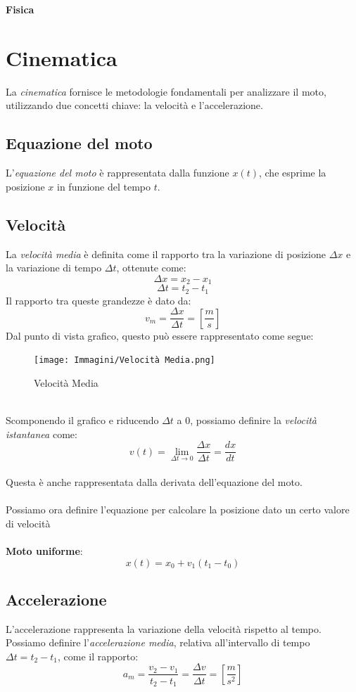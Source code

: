 \documentclass{article}
\begin{document}
\begin{title}
    \centering
    \huge\bfseries  %
    \noindent
    Fisica
\end{title}
\vspace{60pt}
\tableofcontents

\newpage

\section{Cinematica}
La \textit{cinematica} fornisce le metodologie fondamentali per analizzare il moto, utilizzando due concetti chiave: la velocità e l'accelerazione.
\subsection{Equazione del moto}
L'\textit{equazione del moto} è rappresentata dalla funzione \(x(t)\), che esprime la posizione \(x\) in funzione del tempo \(t\).
\subsection{Velocità}
La \textit{velocità media} è definita come il rapporto tra la variazione di posizione \(\Delta x\) e la variazione di tempo \(\Delta t\), ottenute come:
\[\Delta x = x_2 - x_1\]
\[\Delta t = t_2 - t_1\]
Il rapporto tra queste grandezze è dato da:
\[
v_m = \frac{\Delta x}{\Delta t} = [\frac{m}{s}]
\]
Dal punto di vista grafico, questo può essere rappresentato come segue:
\begin{figure}[ht]
    \centering
    \texttt{[image: Immagini/Velocità Media.png]}
    \caption{Velocità Media}
\end{figure}
\\
\noindent Scomponendo il grafico e riducendo \(\Delta t\) a \(0\), possiamo definire la \textit{velocità istantanea} come:
\[
v(t) = \lim_{\Delta t\to 0} \frac{\Delta x}{\Delta t} = \frac{dx}{dt}
\]
\\
Questa è anche rappresentata dalla derivata dell'equazione del moto.\\
\\
Possiamo ora definire l'equazione per calcolare la posizione dato un certo valore di velocità\\
\\
\textbf{Moto uniforme}:
\[
x(t) = x_0 + v_1 (t_1 - t_0)
\]
\subsection{Accelerazione}
L'accelerazione rappresenta la variazione della velocità rispetto al tempo. Possiamo definire l'\textit{accelerazione media}, relativa all'intervallo di tempo \(\Delta t = t_2 - t_1\), come il rapporto:
\[
    a_m = \frac{v_2 - v_1}{t_2 - t_1} =\frac{\Delta v}{\Delta t} = [\frac{m}{s^2}]
\]
\end{document}
